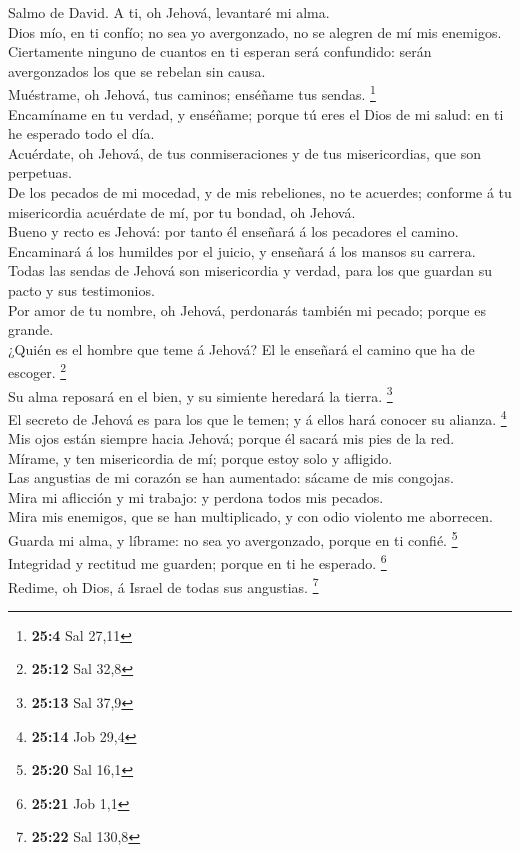  Salmo de David. A ti, oh Jehová, levantaré mi alma.\\
 Dios mío, en ti confío; no sea yo avergonzado, no se
alegren de mí mis enemigos.\\
 Ciertamente ninguno de cuantos en ti esperan será
confundido: serán avergonzados los que se rebelan sin causa.\\
 Muéstrame, oh Jehová, tus caminos; enséñame tus sendas.
\footnote{\textbf{25:4} Sal 27,11}\\
 Encamíname en tu verdad, y enséñame; porque tú eres el Dios
de mi salud: en ti he esperado todo el día.\\
 Acuérdate, oh Jehová, de tus conmiseraciones y de tus
misericordias, que son perpetuas.\\
 De los pecados de mi mocedad, y de mis rebeliones, no te
acuerdes; conforme á tu misericordia acuérdate de mí, por tu bondad, oh
Jehová.\\
 Bueno y recto es Jehová: por tanto él enseñará á los
pecadores el camino.\\
 Encaminará á los humildes por el juicio, y enseñará á los
mansos su carrera.\\
 Todas las sendas de Jehová son misericordia y verdad, para
los que guardan su pacto y sus testimonios.\\
 Por amor de tu nombre, oh Jehová, perdonarás también mi
pecado; porque es grande.\\
 ¿Quién es el hombre que teme á Jehová? El le enseñará el
camino que ha de escoger. \footnote{\textbf{25:12} Sal 32,8}\\
 Su alma reposará en el bien, y su simiente heredará la
tierra. \footnote{\textbf{25:13} Sal 37,9}\\
 El secreto de Jehová es para los que le temen; y á ellos
hará conocer su alianza. \footnote{\textbf{25:14} Job 29,4}\\
 Mis ojos están siempre hacia Jehová; porque él sacará mis
pies de la red.\\
 Mírame, y ten misericordia de mí; porque estoy solo y
afligido.\\
 Las angustias de mi corazón se han aumentado: sácame de
mis congojas.\\
 Mira mi aflicción y mi trabajo: y perdona todos mis
pecados.\\
 Mira mis enemigos, que se han multiplicado, y con odio
violento me aborrecen.\\
 Guarda mi alma, y líbrame: no sea yo avergonzado, porque
en ti confié. \footnote{\textbf{25:20} Sal 16,1}\\
 Integridad y rectitud me guarden; porque en ti he
esperado. \footnote{\textbf{25:21} Job 1,1}\\
 Redime, oh Dios, á Israel de todas sus angustias.
\footnote{\textbf{25:22} Sal 130,8}

